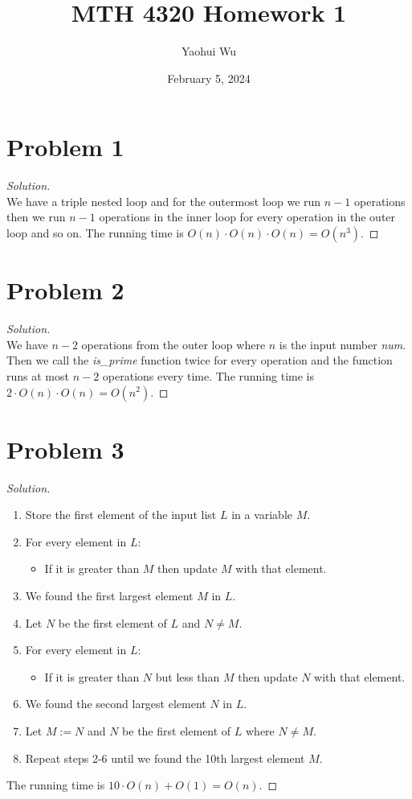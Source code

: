 \documentclass[12pt, letterpaper]{article}
\title{MTH 4320 Homework 1}
\author{Yaohui Wu}
\date{February 5, 2024}
\newenvironment{solution}{\begin{proof}[Solution]\hfill\\}{\end{proof}}
\begin{document}
\maketitle
\tableofcontents
\section{Problem 1}
\begin{solution}
    We have a triple nested loop and for the outermost loop we run \(n-1\) operations
    then we run \(n-1\) operations in the inner loop for every operation in the outer loop
    and so on. The running time is \(O(n)\cdot O(n)\cdot O(n)=O(n^3)\).
\end{solution}

\section{Problem 2}
\begin{solution}
    We have \(n-2\) operations from the outer loop where \(n\) is the input number \textit{num}. Then we call the \textit{is\_prime} function twice for every operation
    and the function runs at most \(n-2\) operations every time. The running time is \(2\cdot O(n)\cdot O(n)=O(n^2)\).
\end{solution}

\section{Problem 3}
\begin{solution}
    \begin{enumerate}
        \item Store the first element of the input list \(L\) in a variable \(M\).
        \item For every element in \(L\):
        \begin{itemize}
            \item If it is greater than \(M\) then update \(M\) with that element.
        \end{itemize}
        \item We found the first largest element \(M\) in \(L\).
        \item Let \(N\) be the first element of \(L\) and \(N\neq M\).
        \item For every element in \(L\):
        \begin{itemize}
            \item If it is greater than \(N\) but less than \(M\) then update \(N\) with that element.
        \end{itemize}
        \item We found the second largest element \(N\) in \(L\).
        \item Let \(M:=N\) and \(N\) be the first element of \(L\) where \(N\neq M\).
        \item Repeat steps 2-6 until we found the 10th largest element \(M\).
    \end{enumerate}
    The running time is \(10\cdot O(n)+O(1)=O(n)\).
\end{solution}
\end{document}
